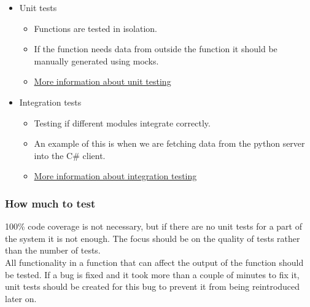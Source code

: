 \begin{itemize}
    \item Unit tests
        \begin{itemize}
            \item Functions are tested in isolation.
            \item If the function needs data from outside the function it should be manually generated using mocks.
            \item \href{http://softwaretestingfundamentals.com/unit-testing/}{More information about unit testing}
        \end{itemize}
    \item Integration tests
        \begin{itemize}
            \item Testing if different modules integrate correctly.
            \item An example of this is when we are fetching data from the python server into the C\# client.
            \item \href{http://softwaretestingfundamentals.com/integration-testing/}{More information about integration testing}
        \end{itemize}
\end{itemize}

\subsubsection{How much to test}
100\% code coverage is not necessary, but if there are no unit tests for a part of the system it is not enough. 
The focus should be on the quality of tests rather than the number of tests.
\\
All functionality in a function that can affect the output of the function should be tested.
If a bug is fixed and it took more than a couple of minutes to fix it, unit tests should be created for this bug to prevent it from being reintroduced later on.
